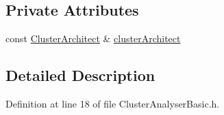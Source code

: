 \subsection*{\-Private \-Attributes}
\begin{DoxyCompactItemize}
\item 
const \hyperlink{classcryomesh_1_1manipulators_1_1ClusterArchitect}{\-Cluster\-Architect} \& \hyperlink{classcryomesh_1_1manipulators_1_1ClusterAnalyserBasic_a680e33ec96d335a5ff84b4398a17ba07}{cluster\-Architect}
\end{DoxyCompactItemize}


\subsection{\-Detailed \-Description}


\-Definition at line 18 of file \-Cluster\-Analyser\-Basic.\-h.



